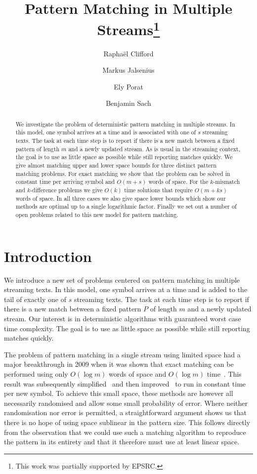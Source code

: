 \documentclass[envcountsame]{llncs}
\title{Pattern Matching in Multiple Streams\footnote{This work was partially supported by EPSRC.}}
\author{
    Rapha\"{e}l Clifford\inst{1} \and
    Markus Jalsenius\inst{1} \and
    Ely Porat\inst{2} \and
    Benjamin Sach\inst{3}}
\institute{
    University of Bristol, Department of Computer Science, Bristol, UK \and
    Bar-Ilan University, Department of Computer Science, Ramat-Gan, Israel \and
    University of Warwick, Department of Computer Science, Coventry, UK}
\begin{document}
\maketitle




\begin{abstract}

    We investigate the problem of deterministic pattern matching in multiple
    streams. In this model, one symbol arrives at a time and is associated with one of $s$
    streaming texts. The task at each time step is to report if there is a new match between a
    fixed pattern of length $m$ and a newly updated stream.  As is
    usual in the streaming context, the goal is to use as little space
    as possible while still reporting matches quickly.  We
    give almost matching upper and lower space bounds for three distinct
    pattern matching problems.  For exact matching we
    show that the problem can be solved in constant time per arriving symbol and $O(m + s)$ words of space.  For the
    $k$-mismatch and $k$-difference problems we give $O(k)$ time solutions that require $O(m+ks)$ words of space. In all three cases we also give space lower bounds which show our methods are optimal up to a single logarithmic factor.  Finally we set out a number of open problems related to this new model for pattern matching.
\end{abstract}


\thispagestyle{plain}

\section{Introduction}

We introduce a new set of problems centered on pattern matching in multiple streaming
texts. In this model, one symbol arrives at a time and is added to the tail
of exactly one of $s$ streaming texts.   The task at each time step is to
report if there is a new match between a fixed pattern $P$ of length
$m$ and a newly updated stream.  Our interest is in deterministic
algorithms with guaranteed worst case time complexity.  The goal is to
use as little space as possible while still reporting matches quickly.

The problem of pattern matching in a single stream using limited space had
a major breakthrough in 2009 when it was shown that exact
matching can be performed using only $O(\log{m})$ words of space and
$O(\log{m})$ time~\cite{Porat:09}. This result was subsequently simplified~\cite{EJS:2010}
and then improved~\cite{BG:2011} to run in constant time per new
symbol.   To achieve this small space, these methods are however all
necessarily randomised and allow some small probability of
error. Where neither randomisation nor error is permitted, a
straightforward argument shows us that there is no
hope of using space sublinear in the pattern size.  This follows
directly from the observation that we could use such a matching
algorithm to reproduce the pattern in its entirety and that it
therefore must use at least linear space.
\end{document}
